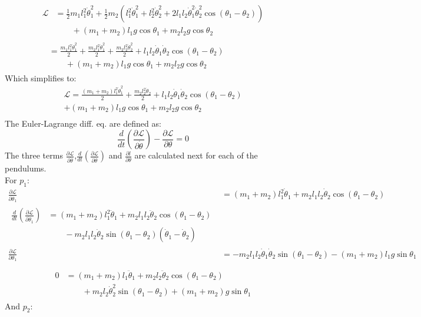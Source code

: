 \begin{align}
	\begin{split}
		\mathcal{L}&=\frac{1}{2}m_1l_1^2\dot\theta_1^2+\frac{1}{2}m_2\left(l_1^2\dot\theta_1^2+l_2^2\dot\theta_2^2+2l_1l_2\dot\theta_1^2\dot\theta_2^2\cos{(\theta_1-\theta_2)}\right)\\
		&\qquad+(m_1+m_2)l_1g\cos{\theta_1}+m_2l_2g\cos{\theta_2}
	\end{split}\\
	\begin{split}
		&=\frac{m_1l_1^2\dot\theta_1^2}{2}+\frac{m_2l_1^2\dot\theta_1^2}{2}+\frac{m_2l_2^2\dot\theta_2^2}{2}+l_1l_2\dot\theta_1\dot\theta_2\cos{(\theta_1-\theta_2)}\\
		&\qquad+(m_1+m_2)l_1g\cos{\theta_1}+m_2l_2g\cos{\theta_2}
	\end{split}
\end{align}
Which simplifies to:
\begin{equation}
	\label{eq:lagrangian}
	\begin{split}
		\mathcal{L}=\frac{(m_1+m_2)l_1^2\dot\theta_1^2}{2}+\frac{m_2l_2^2\dot\theta_2}{2}+l_1l_2\dot\theta_1\dot\theta_2\cos{(\theta_1-\theta_2)}\\
		+(m_1+m_2)l_1g\cos{\theta_1}+m_2l_2g\cos{\theta_2}\\
	\end{split}
\end{equation}
The Euler-Lagrange diff. eq. are defined as:
\begin{equation}
	\frac{d}{dt}\left(\frac{\partial \mathcal{L}}{\partial \dot\theta}\right)-\frac{\partial \mathcal{L}}{\partial \theta} = 0
\end{equation}
The three terms $\frac{\partial \mathcal{L}}{\partial \dot\theta}$,$\frac{d}{dt}\left(\frac{\partial \mathcal{L}}{\partial \dot\theta}\right)$ and $\frac{\partial l}{\partial \theta}$ are calculated next for each of the pendulums. 
\\For $p_1$:
\begin{align}
	\frac{\partial \mathcal{L}}{\partial \dot\theta_1}&=(m_1+m_2)l_1^2\dot\theta_1+m_2l_1l_2\dot\theta_2\cos{(\theta_1-\theta_2)}\\
	\begin{split}
		\frac{d}{dt}\left(\frac{\partial \mathcal{L}}{\partial \dot\theta_1}\right)&=(m_1+m_2)l_1^2\ddot\theta_1+m_2l_1l_2\ddot\theta_2\cos{(\theta_1-\theta_2)}\\
		&\qquad-m_2l_1l_2\dot\theta_2\sin{(\theta_1-\theta_2)(\dot\theta_1-\dot\theta_2)}
	\end{split}\\
	\frac{\partial \mathcal{L}}{\partial \theta_1} &= -m_2l_1l_2\dot\theta_1\dot\theta_2\sin(\theta_1-\theta_2)-(m_1+m_2)l_1g\sin{\theta_1}\\
\end{align}
\begin{align}
	\begin{split}
		0&=(m_1+m_2)l_1\ddot\theta_1+m_2l_2\ddot\theta_2\cos{(\theta_1-\theta_2)}\\
		&\qquad+m_2l_2\dot\theta_2^2\sin{(\theta_1-\theta_2)}+(m_1+m_2)g\sin{\theta_1}
	\end{split}
\end{align}
And $p_2$:

